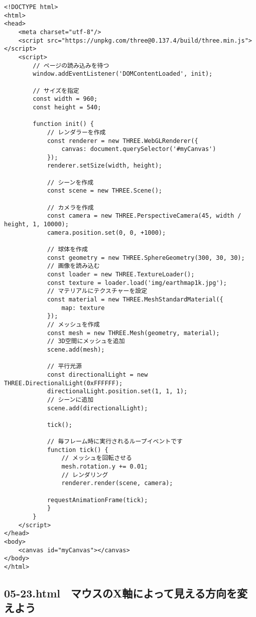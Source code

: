 \documentclass[mingoth,11pt,a4j,uplatex]{jsarticle}
\begin{document}
\begin{lstlisting}[caption=一定時間ごとにランダムな長方形を描こう]
<!DOCTYPE html>
<html>
<head>
    <meta charset="utf-8"/>
    <script src="https://unpkg.com/three@0.137.4/build/three.min.js"></script>
    <script>
        // ページの読み込みを待つ
        window.addEventListener('DOMContentLoaded', init);

        // サイズを指定
        const width = 960;
        const height = 540;

        function init() {
            // レンダラーを作成
            const renderer = new THREE.WebGLRenderer({
                canvas: document.querySelector('#myCanvas')
            });
            renderer.setSize(width, height);

            // シーンを作成
            const scene = new THREE.Scene();

            // カメラを作成
            const camera = new THREE.PerspectiveCamera(45, width / height, 1, 10000);
            camera.position.set(0, 0, +1000);

            // 球体を作成
            const geometry = new THREE.SphereGeometry(300, 30, 30);
            // 画像を読み込む
            const loader = new THREE.TextureLoader();
            const texture = loader.load('img/earthmap1k.jpg');
            // マテリアルにテクスチャーを設定
            const material = new THREE.MeshStandardMaterial({
                map: texture
            });
            // メッシュを作成
            const mesh = new THREE.Mesh(geometry, material);
            // 3D空間にメッシュを追加
            scene.add(mesh);

            // 平行光源
            const directionalLight = new THREE.DirectionalLight(0xFFFFFF);
            directionalLight.position.set(1, 1, 1);
            // シーンに追加
            scene.add(directionalLight);

            tick();

            // 毎フレーム時に実行されるループイベントです
            function tick() {
                // メッシュを回転させる
                mesh.rotation.y += 0.01;
                // レンダリング
                renderer.render(scene, camera);

            requestAnimationFrame(tick);
            }
        }
    </script>
</head>
<body>
    <canvas id="myCanvas"></canvas>
</body>
</html>
\end{lstlisting}

\subsection{05-23.html　マウスのX軸によって見える方向を変えよう}
\end{document}
